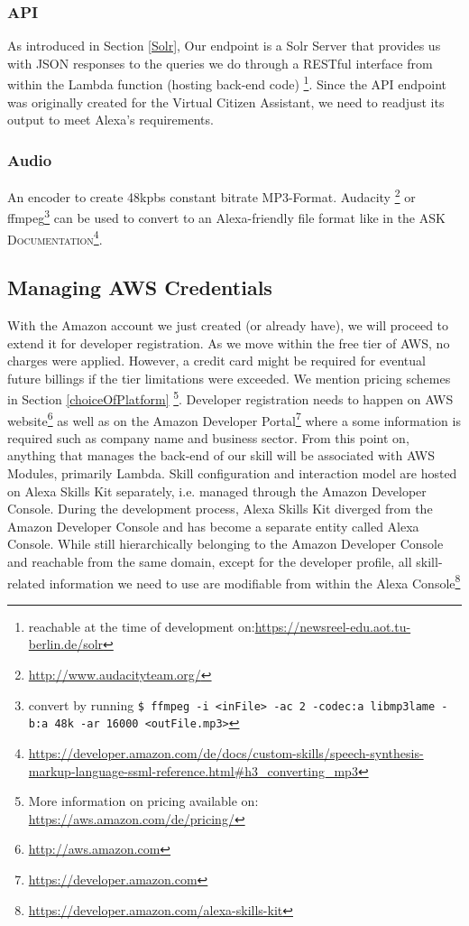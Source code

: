 	
\subsubsection*{API} 
As introduced in Section \ref{Solr}, Our endpoint is a Solr Server that provides us with JSON responses to the queries we do through a RESTful interface from within the Lambda function (hosting back-end code) \footnote{reachable at the time of development on:\url{https://newsreel-edu.aot.tu-berlin.de/solr}}. Since the API endpoint was originally created for the Virtual Citizen Assistant, we need to readjust its output to meet Alexa's requirements.


	
\subsubsection*{Audio} An encoder to create 48kpbs constant bitrate MP3-Format. Audacity \footnote{\url{http://www.audacityteam.org/}} or ffmpeg\footnote{convert by running \lstinline|$ ffmpeg -i <inFile> -ac 2 -codec:a libmp3lame -b:a 48k -ar 16000 <outFile.mp3>|} can be used to convert to an Alexa-friendly file format like in the \textsc{ASK Documentation}\footnote{\url{https://developer.amazon.com/de/docs/custom-skills/speech-synthesis-markup-language-ssml-reference.html\#h3_converting_mp3}}.
	


\subsection*{Managing AWS Credentials}

With the Amazon account we just created (or already have), we will proceed to extend it for developer registration. As we move within the free tier of AWS, no charges were applied. However, a credit card might be required for eventual future billings if the tier limitations were exceeded. We mention pricing schemes in Section \ref{choiceOfPlatform} \footnote{More information on pricing available on: \url{https://aws.amazon.com/de/pricing/}}. Developer registration needs to happen on AWS website\footnote{\url{http://aws.amazon.com}} as well as on the Amazon Developer Portal\footnote{\url{https://developer.amazon.com}} where a some information is required such as company name and business sector. From this point on, anything that manages the back-end of our skill will be associated with AWS Modules, primarily Lambda. Skill configuration and interaction model are hosted on Alexa Skills Kit separately, i.e. managed through the Amazon Developer Console. During the development process, Alexa Skills Kit diverged from the Amazon Developer Console and has become a separate entity called Alexa Console. While still hierarchically belonging to the Amazon Developer Console and reachable from the same domain, except for the developer profile, all skill-related information we need to use are modifiable from within the Alexa Console\footnote{\url{https://developer.amazon.com/alexa-skills-kit}}

